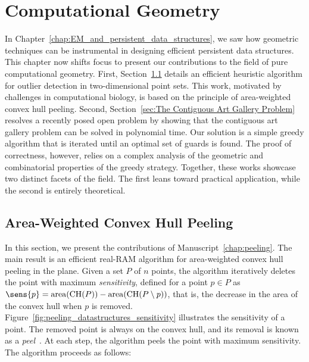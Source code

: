 \chapter{Computational Geometry}
\label{chap:geom_algos}

In Chapter~\ref{chap:EM_and_persistent_data_structures}, we saw how geometric techniques can be instrumental in designing efficient persistent data structures. 
This chapter now shifts focus to present our contributions to the field of pure computational geometry. 
First, Section~\ref{sec:Area-Weighted Convex Hull Peeling} details an efficient heuristic algorithm for outlier detection in two-dimensional point sets. 
This work, motivated by challenges in computational biology, is based on the principle of area-weighted convex hull peeling. 
Second, Section~\ref{sec:The Contiguous Art Gallery Problem} resolves a recently posed open problem by showing that the contiguous art gallery problem can be solved in polynomial time. 
Our solution is a simple greedy algorithm that is iterated until an optimal set of guards is found. 
The proof of correctness, however, relies on a complex analysis of the geometric and combinatorial properties of the greedy strategy. 
Together, these works showcase two distinct facets of the field. The first leans toward practical application, while the second is entirely theoretical.

\section{Area-Weighted Convex Hull Peeling}
\label{sec:Area-Weighted Convex Hull Peeling}
In this section, we present the contributions of Manuscript~\ref{chap:peeling}. 
The main result is an efficient real-RAM algorithm for area-weighted convex hull peeling in the plane. 
Given a set $P$ of $n$ points, the algorithm iteratively deletes the point with maximum \emph{sensitivity}, defined for a point $p \in P$ as $\sens{p} = \mathrm{area}(\mathrm{CH}(P)) - \mathrm{area}(\mathrm{CH}(P \setminus {p}))$, that is, the decrease in the area of the convex hull when $p$ is removed. Figure~\ref{fig:peeling_datastructures_sensitivity} illustrates the sensitivity of a point.
The removed point is always on the convex hull, and its removal is known as a \emph{peel}~\cite{peeling_layers1, shamos1978thesis}. 
At each step, the algorithm peels the point with maximum sensitivity. 
The algorithm proceeds as follows:

